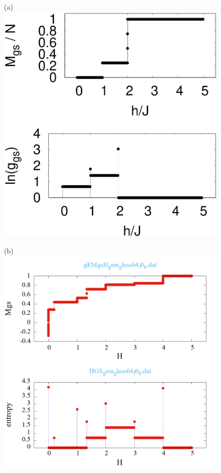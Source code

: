 \documentclass[preprint,12pt]{elsarticle}
\begin{document}
	
	\begin{figure}[H]
		\begin{minipage}[h]{0.32\linewidth}
			\centering(a)
			\includegraphics[width=1\linewidth]{pictures/_multiplot_SI64_J0_1}
		\end{minipage}
		\hfill
		\begin{minipage}[h]{0.32\linewidth}
			\centering(b)
			\includegraphics[width=1\linewidth]{pictures/_multiplot_SG64_J0}

\end{minipage}
\end{figure}
\end{document}

